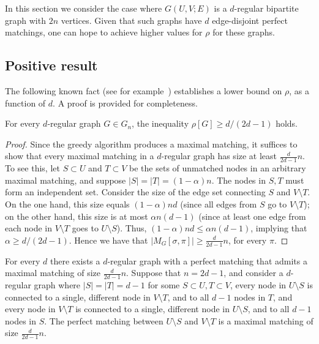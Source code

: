 \documentclass{toc}
\theoremstyle{plain}
\begin{document}
In this section we consider the case where $G(U,V;E)$ is a $d$-regular bipartite graph with $2n$ vertices. Given that such graphs have $d$
%
edge-disjoint  %
perfect matchings, one can hope to achieve higher values for $\rho$ for these graphs.

\subsection{Positive result}
\label{sec:regular-pos}

The following known %
%
fact %
(see for example~\cite{NaorW15}) establishes a lower bound on $\rho$, as a function of $d$.
A proof is provided for completeness.

\begin{proposition}
	\label{pro:smalld}
For every $d$-regular graph $G \in G_n$, 
%
the inequality  $\rho[G] \ge  d/(2d-1)$ holds.  %
\end{proposition}

\begin{proof}
	Since the greedy algorithm produces a maximal matching, it suffices to show that every maximal matching in a $d$-regular graph has size at least $\frac{d}{2d-1}n$.
	To see this, let $S \subset U$ and $T \subset V$ be the sets of unmatched nodes in an arbitrary maximal matching, and suppose $|S|=|T|=(1-\alpha) n$. The nodes in $S,T$ must form an independent set.
	Consider the size of the edge set connecting $S$ and $V \setminus T$.
	On the one hand, this size equals $(1-\alpha) n d$ (since all edges from $S$ go to $V \setminus T$); on the other hand, this size is at most $\alpha n (d-1)$ (since at least one edge from each node in $V \setminus T$ goes to $U \setminus S$).
	Thus, $(1-\alpha) n d \leq \alpha n (d-1)$, implying that $\alpha \geq d/(2d-1)$.
	Hence we have that $|M_G[\sigma,\pi]| \ge  \frac{d}{2d-1}n$, for every $\pi$.
\end{proof}

\begin{remark}
	For every $d$ there exists a $d$-regular graph with a perfect matching that admits a maximal matching of size $\frac{d}{2d-1}n$. Suppose that $n = 2d-1$, and
consider a $d$-regular graph where $|S|=|T|=d-1$ for some $S \subset U, T \subset V$, every node in $U \setminus S$ is connected to a single, different node in $V \setminus T$, and to all $d-1$ nodes in $T$, and every node in $V \setminus T$ is connected to a single, different node in $U \setminus S$, and to all $d-1$ nodes in $S$. The perfect matching between $U \setminus S$ and $V \setminus T$ is a maximal matching of size $\frac{d}{2d-1}n$.
\end{remark}
\end{document}
